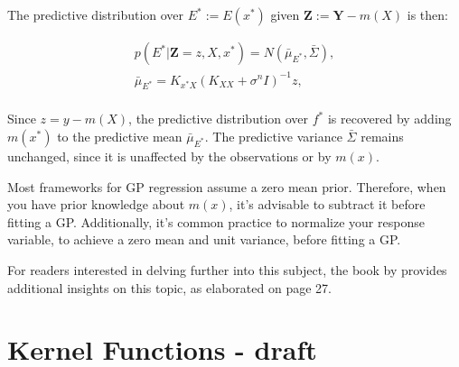The predictive distribution over $E^{\ast} := E(x^{\ast})$ given $\mathbf{Z} := \mathbf{Y} - m(X)$ is then:

\begin{gather*}
    p(E^{\ast}| \mathbf{Z} = z, X, x^{\ast}) = N(\bar{\mu}_{E^{\ast}}, \bar{\Sigma}), \\
    \bar{\mu}_{E^{\ast}} = K_{x^{\ast}X} (K_{XX} + \sigma^{n} I )^{-1} z,\\
\end{gather*}

Since $ z = y - m(X)$, the predictive distribution over $f^{\ast}$ is recovered by adding $m(x^{\ast})$ to
the predictive mean $\bar{\mu}_{E^{\ast}}$. The predictive variance $\bar{\Sigma}$ remains unchanged,
since it is unaffected by the observations or by $m(x)$.

%
%
%

Most frameworks for GP regression assume a zero mean prior.
Therefore, when you have prior knowledge about $m(x)$, it's advisable to subtract it before fitting a GP.
Additionally, it's common practice to normalize your response variable,
to achieve a zero mean and unit variance, before fitting a GP.


For readers interested in delving further into this subject,
the book by \citeauthor{rasmussen_gaussian_2006} provides additional insights on this topic,
as elaborated on page 27.


\section{Kernel Functions - draft}\label{subsec:kernel}

